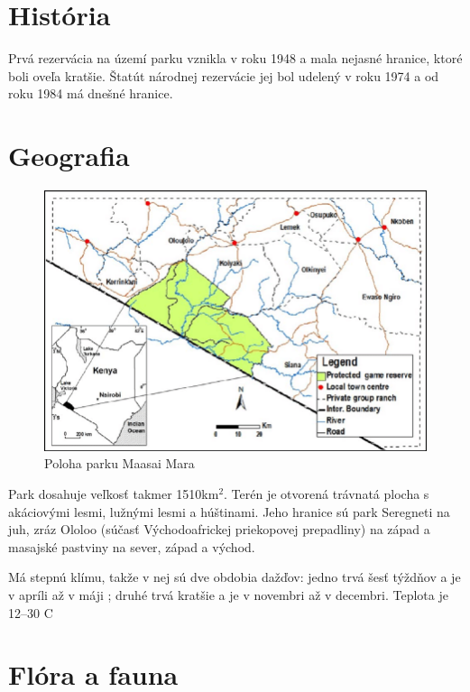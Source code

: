 \documentclass{article}
\begin{document}
\section{História}
Prvá rezervácia na území parku vznikla v roku 1948 a mala nejasné hranice, ktoré boli oveľa kratšie.
Štatút národnej rezervácie jej bol udelený v roku 1974 a od roku 1984 má dnešné hranice.

\section{Geografia}

\begin{figure}[h]
\includegraphics[scale=0.3]{location.png}\caption{Poloha parku Maasai Mara}
\end{figure} 
\medskip

\noindent
Park dosahuje veľkosť takmer 1510km$^2$. Terén je otvorená trávnatá plocha s akáciovými lesmi, lužnými lesmi a húštinami. Jeho hranice sú park Seregneti na juh, 
zráz Ololoo (súčasť Východoafrickej priekopovej prepadliny) na západ
a masajské pastviny na sever, západ a východ.

\noindent
Má stepnú klímu, takže v nej sú dve obdobia dažďov: jedno trvá šesť týždňov a je v apríli až v máji ; druhé trvá kratšie a je v novembri až v decembri.
Teplota je 12--30 \degree C
\noindent 
 
\newpage
\section{Flóra a fauna}
\end{document}
